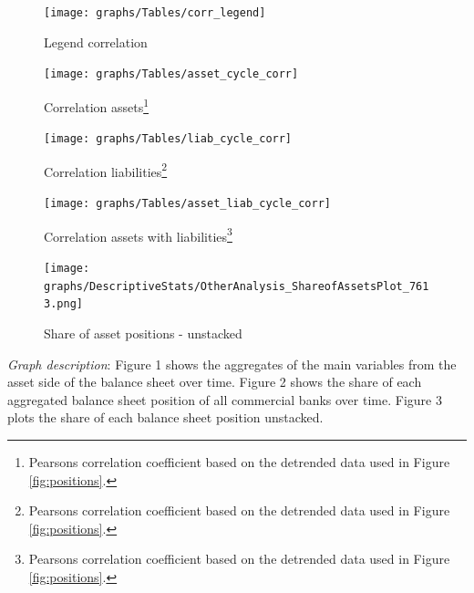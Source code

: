 \documentclass[12pt, a4paper]{article} %
\begin{document}
\begin{figure}[hbtp]
\begin{minipage}{\textwidth}
\centering
\caption[1]{Legend correlation}
\texttt{[image: graphs/Tables/corr\_legend]}
\label{fig:corr_legend}
\end{minipage}
\end{figure}
\begin{figure}[hbtp]
\begin{minipage}{\textwidth}

\centering
\caption[1]{Correlation assets\footnote{Pearsons correlation coefficient based on the detrended data used in Figure \ref{fig:positions}.} }
\texttt{[image: graphs/Tables/asset\_cycle\_corr]}
\label{fig:corr_assets}

\end{minipage}
\end{figure}

\begin{figure}[hbtp]
\begin{minipage}{\textwidth}

\centering
\caption[1]{Correlation liabilities\footnote{Pearsons correlation coefficient based on the detrended data used in Figure \ref{fig:positions}.} }
\texttt{[image: graphs/Tables/liab\_cycle\_corr]}
\label{fig:corr_liab}

\end{minipage}
\end{figure}



\begin{figure}[hbtp]
\begin{minipage}{\textwidth}

\centering
\caption[1]{Correlation assets with liabilities\footnote{Pearsons correlation coefficient based on the detrended data used in Figure \ref{fig:positions}.} }
\texttt{[image: graphs/Tables/asset\_liab\_cycle\_corr]}
\label{fig:corr_assets_liab}

\end{minipage}
\end{figure}



\begin{figure}[hbtp]
\centering
\caption{Share of asset positions - unstacked}
\texttt{[image: graphs/DescriptiveStats/OtherAnalysis\_ShareofAssetsPlot\_7613.png]}
\label{fig:sharepositions}
\end{figure}


\noindent \textit{Graph description}: Figure 1 shows the aggregates of the main variables from the asset side of the balance sheet over time. Figure 2 shows the share of each aggregated balance sheet position of all commercial banks over time. Figure 3 plots the share of each balance sheet position unstacked.\\
\end{document}

